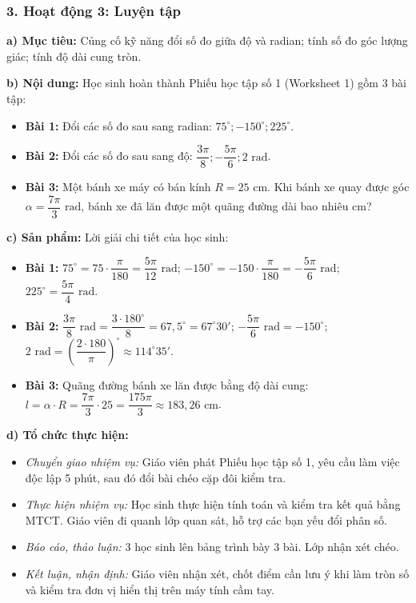 \documentclass[12pt, a4paper]{article}
\begin{document}
\subsubsection*{3. Hoạt động 3: Luyện tập}
\textbf{a) Mục tiêu:} Củng cố kỹ năng đổi số đo giữa độ và radian; tính số đo góc lượng giác; tính độ dài cung tròn.

\textbf{b) Nội dung:} Học sinh hoàn thành Phiếu học tập số 1 (Worksheet 1) gồm 3 bài tập:
\begin{itemize}[leftmargin=0.6cm]
    \item \textbf{Bài 1:} Đổi các số đo sau sang radian: $75^\circ; -150^\circ; 225^\circ$.
    \item \textbf{Bài 2:} Đổi các số đo sau sang độ: $\dfrac{3\pi}{8}; -\dfrac{5\pi}{6}; 2\text{ rad}$.
    \item \textbf{Bài 3:} Một bánh xe máy có bán kính $R = 25\text{ cm}$. Khi bánh xe quay được góc $\alpha = \dfrac{7\pi}{3}\text{ rad}$, bánh xe đã lăn được một quãng đường dài bao nhiêu cm?
\end{itemize}

\textbf{c) Sản phẩm:} Lời giải chi tiết của học sinh:
\begin{itemize}[leftmargin=0.6cm]
    \item \textbf{Bài 1:} $75^\circ = 75 \cdot \dfrac{\pi}{180} = \dfrac{5\pi}{12}\text{ rad}$; $-150^\circ = -150 \cdot \dfrac{\pi}{180} = -\dfrac{5\pi}{6}\text{ rad}$; $225^\circ = \dfrac{5\pi}{4}\text{ rad}$.
    \item \textbf{Bài 2:} $\dfrac{3\pi}{8}\text{ rad} = \dfrac{3 \cdot 180^\circ}{8} = 67{,}5^\circ = 67^\circ 30'$; $-\dfrac{5\pi}{6}\text{ rad} = -150^\circ$; $2\text{ rad} = \left(\dfrac{2 \cdot 180}{\pi}\right)^\circ \approx 114^\circ 35'$.
    \item \textbf{Bài 3:} Quãng đường bánh xe lăn được bằng độ dài cung: $l = \alpha \cdot R = \dfrac{7\pi}{3} \cdot 25 = \dfrac{175\pi}{3} \approx 183{,}26\text{ cm}$.
\end{itemize}

\textbf{d) Tổ chức thực hiện:}
\begin{itemize}[leftmargin=0.6cm]
    \item \textit{Chuyển giao nhiệm vụ:} Giáo viên phát Phiếu học tập số 1, yêu cầu làm việc độc lập 5 phút, sau đó đổi bài chéo cặp đôi kiểm tra.
    \item \textit{Thực hiện nhiệm vụ:} Học sinh thực hiện tính toán và kiểm tra kết quả bằng MTCT. Giáo viên đi quanh lớp quan sát, hỗ trợ các bạn yếu đổi phân số.
    \item \textit{Báo cáo, thảo luận:} 3 học sinh lên bảng trình bày 3 bài. Lớp nhận xét chéo.
    \item \textit{Kết luận, nhận định:} Giáo viên nhận xét, chốt điểm cần lưu ý khi làm tròn số và kiểm tra đơn vị hiển thị trên máy tính cầm tay.
\end{itemize}
\end{document}
